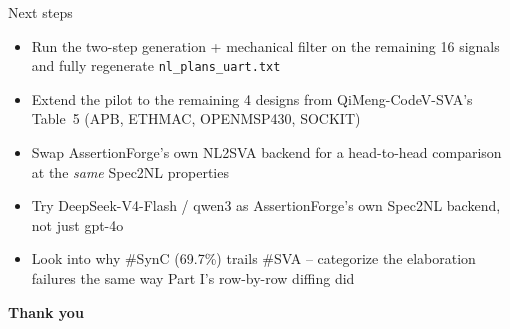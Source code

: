 \documentclass[aspectratio=169]{beamer}
\begin{document}
\begin{frame}{Next steps}
  \begin{itemize}
    \item Run the two-step generation + mechanical filter on the remaining
      16 signals and fully regenerate \texttt{nl\_plans\_uart.txt}
    \item Extend the pilot to the remaining 4 designs from QiMeng-CodeV-SVA's
      Table~5 (APB, ETHMAC, OPENMSP430, SOCKIT)
    \item Swap AssertionForge's own NL2SVA backend for a head-to-head
      comparison at the \emph{same} Spec2NL properties
    \item Try DeepSeek-V4-Flash / qwen3 as AssertionForge's own
      Spec2NL backend, not just gpt-4o
    \item Look into why \#SynC (69.7\%) trails \#SVA -- categorize the
      elaboration failures the same way Part I's row-by-row diffing did
  \end{itemize}
  \vspace{16pt}
  \begin{center}
    \Large\textbf{Thank you}
  \end{center}
\end{frame}
\end{document}
